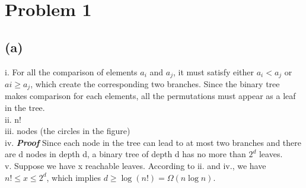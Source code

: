 \documentclass[twoside]{homework}
\begin{document}
\maketitle
\section*{Problem 1}
\subsection*{(a)}
i. For all the comparison of elements $a_i$ and $a_j$, it must satisfy either $a_i<a_j$ or $ai\ge a_j$, which create the corresponding two branches. Since the binary tree makes comparison for each elements, all the permutations must appear as a leaf in the tree.
\\ii. n!
\\iii. nodes (the circles in the figure)
\\iv. \textbf{\emph{Proof}} \quad Since each node in the tree can lead to at most two branches and there are d nodes in depth d, a binary tree of depth d has no more than $2^d$ leaves.
\\v. Suppose we have x reachable leaves. According to ii. and iv., we have $n!\le x\le 2^d$, which implies $d\ge\log(n!)=\Omega(n\log n)$.
\end{document}
